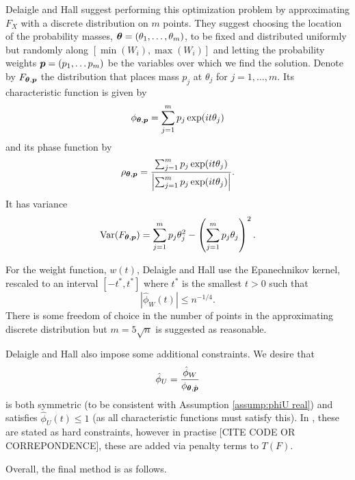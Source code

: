 	Delaigle and Hall suggest performing this optimization problem by approximating $F_X$ with a discrete distribution on $m$ points. They suggest choosing the location of the probability masses, ${\bm{{\theta}}} = (\theta_1, \dots, \theta_m)$, to be fixed and distributed uniformly but randomly along $[\min(W_i), \max(W_i)]$ and letting the probability weights ${\bm{{p}}} = (p_1, \dots p_m)$ be the variables over which we find the solution. Denote by $F_{{\bm{{\theta}}}, {\bm{{p}}}}$ the distribution that places mass $p_j$ at $\theta_j$ for $j = 1,\dots, m$. Its characteristic function is given by
	\begin{equation}
		\phi_{{\bm{{\theta}}}, {\bm{{p}}}} = \sum_{j = 1}^m p_j \exp(it\theta_j)
	\end{equation}
	and its phase function by
	\begin{equation}
		\rho_{{\bm{{\theta}}}, {\bm{{p}}}} = \frac{ \sum_{j = 1}^m p_j \exp(it\theta_j)}{\left| \sum_{j = 1}^m p_j \exp(it\theta_j)\right|}.
	\end{equation}
	It has variance
	\begin{equation}
		\mathrm{Var}(F_{{\bm{{\theta}}}, {\bm{{p}}}}) = \sum_{j = 1}^m p_j \theta_j^2 - \left( \sum_{j=1}^m p_j \theta_j \right)^2.
	\end{equation}

	For the weight function, $w(t)$, Delaigle and Hall use the Epanechnikov kernel, rescaled to an interval $[-t^*, t^*]$ where $t^*$ is the smallest $t > 0$ such that 
	\begin{equation}
	\label{eq:define t star}
		\left|\hat{\phi}_W(t)\right| \leq n^{-1/4}.
	\end{equation}
	There is some freedom of choice in the number of points in the approximating discrete distribution but $m = 5\sqrt{n}$ is suggested as reasonable.

	Delaigle and Hall also impose some additional constraints. We desire that 
	\begin{equation}
		\hat{\phi}_U = \frac{\hat{\phi}_W}{\phi_{{\bm{{\theta}}}, \hat{{\bm{{p}}}}}}
	\end{equation}
	is both symmetric (to be consistent with Assumption \ref{assump:phiU real}) and satisfies $\hat{\phi}_U(t) \leq 1$ (as all characteristic functions must satisfy this). In \cite{Delaigle2016-la}, these are stated as hard constraints, however in practise [CITE CODE OR CORREPONDENCE], these are added via penalty terms to $T(F)$.

	Overall, the final method is as follows.

